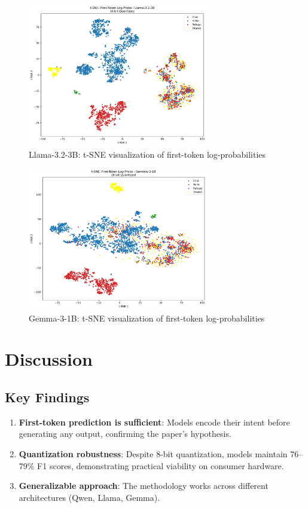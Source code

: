 \documentclass[11pt]{article}
\begin{document}
\begin{figure}[H]
\centering
\includegraphics[width=0.7\textwidth]{tsne_Llama_3_2_3B_8bit.png}
\caption{Llama-3.2-3B: t-SNE visualization of first-token log-probabilities}
\label{fig:llama}
\end{figure}

\begin{figure}[H]
\centering
\includegraphics[width=0.7\textwidth]{tsne_Gemma_3_1B_8bit.png}
\caption{Gemma-3-1B: t-SNE visualization of first-token log-probabilities}
\label{fig:gemma}
\end{figure}

\section{Discussion}

\subsection{Key Findings}

\begin{enumerate}
    \item \textbf{First-token prediction is sufficient}: Models encode their intent before generating any output, confirming the paper's hypothesis.
    \item \textbf{Quantization robustness}: Despite 8-bit quantization, models maintain 76--79\% F1 scores, demonstrating practical viability on consumer hardware.
    \item \textbf{Generalizable approach}: The methodology works across different architectures (Qwen, Llama, Gemma).
\end{enumerate}
\end{document}
